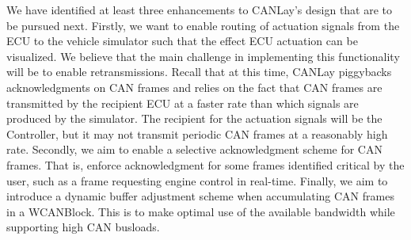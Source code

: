 \documentclass[letterpaper,twocolumn,12pt]{article}
\begin{document}
We have identified at least three enhancements to CANLay's design that are to be pursued next. 
Firstly, we want to enable routing of actuation signals from the ECU to the vehicle simulator such that the effect ECU actuation can be visualized. We believe that the main challenge in implementing this functionality will be to enable retransmissions. Recall that at this time, CANLay piggybacks acknowledgments on CAN frames and relies on the fact that CAN frames are transmitted by the recipient ECU at a faster rate than which signals are produced by the simulator. The recipient for the actuation signals will be the Controller, but it may not transmit periodic CAN frames at a reasonably high rate. 
Secondly, we aim to enable a selective acknowledgment scheme for CAN frames. That is, enforce acknowledgment for some frames identified critical by the user, such as a frame requesting engine control in real-time. 
Finally, we aim to introduce a dynamic buffer adjustment scheme when accumulating CAN frames in a WCANBlock. This is to make optimal use of the available bandwidth while supporting high CAN busloads.

 



\end{document}

